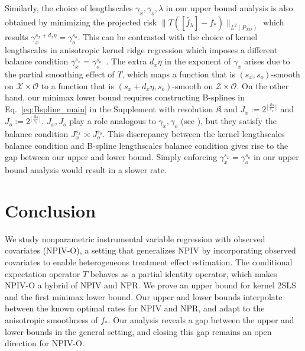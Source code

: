 \documentclass[11pt]{article}
\newcommand{\0}{\mathbf{0}}
\begin{document}
Similarly, the choice of lengthscales $\gamma_x,\gamma_o, \lambda$ in our upper bound analysis is also obtained by minimizing the projected risk $\|T([\hat{f}_\lambda] - f_*)\|_{L^2(P_{X O})}$ which results 
$\gamma_x^{s_x+d_x\eta} = \gamma_o^{s_o}$. 
This can be contrasted with the choice of kernel lengthscales in anisotropic kernel ridge regression which imposes a different balance condition $\gamma_x^{s_x} = \gamma_o^{s_o}$~\citep{hang2021optimal}. The extra $d_x\eta$ in the exponent of $\gamma_x$ arises due to the partial smoothing effect of $T$, which maps a function that is $(s_x, s_o)$-smooth on $\mathcal{X} \times \mathcal{O}$ to a function that is $(s_x + d_x\eta, s_o)$-smooth on $\mathcal{Z} \times \mathcal{O}$. 
On the other hand, our minimax lower bound requires constructing B-splines in Eq.~\eqref{eq:Bspline_main} in the Supplement with resolution $\mathfrak{K}$ and $J_x := 2^{\lfloor\frac{\mathfrak{K} s}{s_x}\rfloor}$ and $J_o := 2^{\lfloor\frac{\mathfrak{K} s}{s_o}\rfloor}$. $J_x, J_o$ play a role analogous to $\gamma_x, \gamma_o$ (see ), but they satisfy the balance condition $J_x^{s_x} \asymp J_o^{s_o}$. 
This discrepancy between the kernel lengthscales balance condition and B-spline lengthscales balance condition gives rise to the gap between our upper and lower bound.
Simply enforcing $\gamma_x^{s_x} = \gamma_o^{s_o}$ in our upper bound analysis would result in a slower rate. 


\section{Conclusion}

We study nonparametric instrumental variable regression with observed covariates (NPIV-O), a setting that generalizes NPIV by incorporating observed covariates to enable heterogeneous treatment effect estimation. 
The conditional expectation operator $T$ behaves as a partial identity operator, which makes NPIV-O a hybrid of NPIV and NPR. 
We prove an upper bound for kernel 2SLS and the first minimax lower bound. 
Our upper and lower bounds interpolate between the known optimal rates for NPIV and NPR, and adapt to the anisotropic smoothness of $f_\ast$. 
Our analysis reveals a gap between the upper and lower bounds in the general setting, and closing this gap remains an open direction for NPIV-O. %



     
\end{document}
